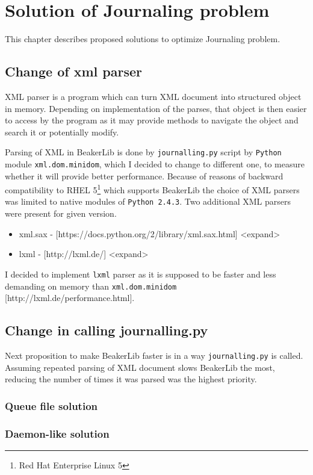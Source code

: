 \chapter{Solution of Journaling problem}
This chapter describes proposed solutions to optimize Journaling problem.

\section{Change of xml parser}
XML parser is a program which can turn XML document into structured object in memory. Depending on implementation of the parses, that object is then easier to access by the program as it may provide methods to navigate the object and search it or potentially modify. 

Parsing of XML in BeakerLib is done by \texttt{journalling.py} script by \texttt{Python} module \texttt{xml.dom.minidom}, which I decided to change to different one, to measure whether it will provide better performance. Because of reasons of backward compatibility to RHEL 5\footnote{Red Hat Enterprise Linux 5} which supports BeakerLib the choice of XML parsers was limited to native modules of \texttt{Python 2.4.3}. Two additional XML parsers were present for given version.

\begin{itemize}
\item xml.sax -  [https://docs.python.org/2/library/xml.sax.html] <expand>
\item lxml - [http://lxml.de/] <expand>
\end{itemize}

I decided to implement \texttt{lxml} parser as it is supposed to be faster and less demanding on memory than \texttt{xml.dom.minidom} [http://lxml.de/performance.html].

\section{Change in calling journalling.py}
Next proposition to make BeakerLib faster is in a way \texttt{journalling.py} is called. Assuming repeated parsing of XML document slows BeakerLib the most, reducing the number of times it was parsed was the highest priority. 

\subsection{Queue file solution}

\subsection{Daemon-like solution}


